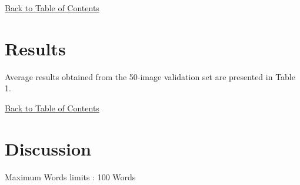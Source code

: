 \documentclass[12pt,a4paper]{article}
\begin{document}
\hyperref[contents]{\small Back to Table of Contents}
\newpage
\section{Results}
Average results obtained from the 50-image validation set are presented in Table 1.


\hyperref[contents]{\small Back to Table of Contents}
\newpage
\section{Discussion}
{Maximum Words limits : 100 Words}



 

\end{document}
